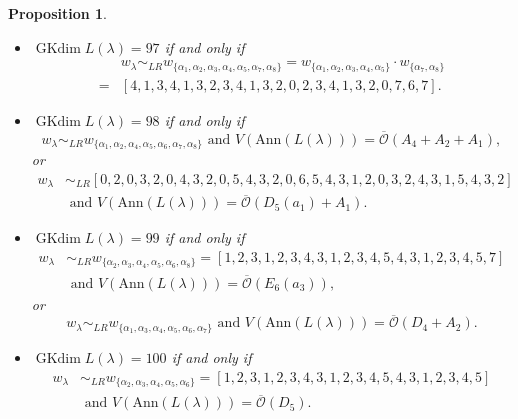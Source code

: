 \documentclass[reqno,12pt]{amsart}
\numberwithin{equation}{section}
\theoremstyle{plain}
\newtheorem{Prop}[Thm]{Proposition}
\theoremstyle{definition}
\newcommand{\lam}{\lambda}
\newcommand{\Ann}{\mathrm{Ann}}
\newcommand{\gkd}{\operatorname{GKdim}}
\begin{document}
\begin{Prop}
\begin{itemize}
\item[(20)] $\gkd L(\lambda)=97$ if and only if \begin{align*}
           &w_{\lambda}\sim_{LR}w_{\{\alpha_1,\alpha_2,\alpha_3,\alpha_4,\alpha_5,\alpha_7,\alpha_8\}}=w_{\{\alpha_1,\alpha_2,\alpha_3,\alpha_4,\alpha_5\}} \cdot w_{\{\alpha_7,\alpha_8\}}\\ 
           =& [4,1,3,4,1,3,2,3,4,1,3,2,0,2,3,4,1,3,2,0,7,6,7].          %
      \end{align*}






\item[(21)] $\gkd L(\lambda)=98$ if and only if $$w_{\lambda}\sim_{LR}
w_{\{\alpha_1,\alpha_2,\alpha_4,\alpha_5,\alpha_6,\alpha_7,\alpha_8\}} \text{~and~} V(\Ann (L(\lam)))=\overline{\mathcal{O}}(A_4+A_2+A_1),$$ 
or \begin{align*}
    w_{\lambda}&\sim_{LR}[0,2,0,3,2,0,4,3,2,0,5,4,3,2,0,6,5,4,3,1,2,0,3,2,4,3,1,5,4,3,2]\\
&\text{~and~} V(\Ann (L(\lam)))=\overline{\mathcal{O}}({D}_5(a_1)+A_1).
\end{align*}



 \item[(22)] $\gkd L(\lambda)=99$ if and only if \begin{align*}
w_{\lambda}&\sim_{LR}
w_{\{\alpha_2,\alpha_3,\alpha_4,\alpha_5,\alpha_6,\alpha_8\}}=[1, 2, 3, 1, 2, 3, 4, 3, 1, 2, 3, 4, 5, 4, 3, 1, 2, 3, 4, 5,7]\\
& \text{~and~} V(\Ann (L(\lam)))=\overline{\mathcal{O}}({E}_6(a_3)),
 \end{align*}
 or $$w_{\lambda}\sim_{LR}
 w_{\{\alpha_1,\alpha_3,\alpha_4,\alpha_5,\alpha_6,\alpha_7\}} \text{~and~} V(\Ann (L(\lam)))=\overline{\mathcal{O}}(D_4+A_2).$$
      
        \item[(23)] $\gkd L(\lambda)=100$ if and only if \begin{align*}w_{\lambda}&\sim_{LR}
        w_{\{\alpha_2,\alpha_3,\alpha_4,\alpha_5,\alpha_6\}}=[1, 2, 3, 1, 2, 3, 4, 3, 1, 2, 3, 4, 5, 4, 3, 1, 2, 3, 4, 5]\\
        &\text{~and~} V(\Ann (L(\lam)))=\overline{\mathcal{O}}(D_5).
        \end{align*}
  

\end{itemize}
\end{Prop}
\end{document}
